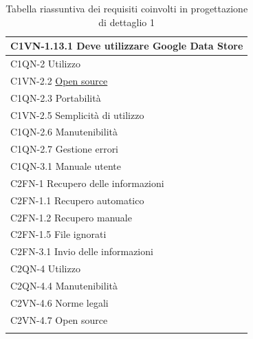\begin{footnotesize}
\begin{longtable}[!h]{|l|}
C1VN-1.13.1 Deve utilizzare Google Data Store \\ \hline  
C1QN-2 Utilizzo \\\hline  
C1VN-2.2 \underline{Open source} \\ \hline                 
C1QN-2.3 Portabilit\`a \\ \hline
C1VN-2.5 Semplicit\`a di utilizzo \\ \hline
C1QN-2.6 Manutenibilit\`a \\ \hline             
C1QN-2.7 Gestione errori \\ \hline      
C1QN-3.1 Manuale utente \\ \hline
C2FN-1 Recupero delle informazioni \\ \hline
C2FN-1.1 Recupero automatico \\ \hline
C2FN-1.2 Recupero manuale \\ \hline
C2FN-1.5 File ignorati \\ \hline
C2FN-3.1 Invio delle informazioni \\ \hline
C2QN-4 Utilizzo \\ \hline
C2QN-4.4 Manutenibilit\`a \\ \hline
C2VN-4.6 Norme legali \\ \hline
C2VN-4.7 Open source \\ \hline
\caption{Tabella riassuntiva dei requisiti coinvolti in progettazione di
dettaglio 1}
\end{longtable}
\end{footnotesize}

\newpage
